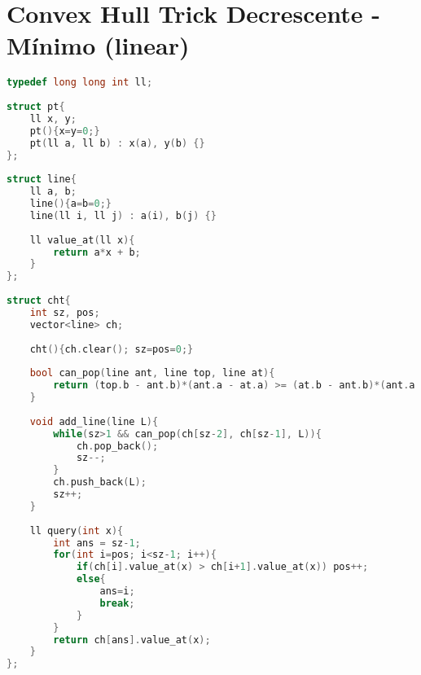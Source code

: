 \documentclass[12pt,a4paper,twoside]{report}
\begin{document}
\section{Convex Hull Trick Decrescente - Mínimo (linear)}
\noindent\begin{lstlisting}[caption=Convex Hull Trick Decrescente - Mínimo (linear),language=C++]
typedef long long int ll;
 
struct pt{
    ll x, y;
    pt(){x=y=0;}
    pt(ll a, ll b) : x(a), y(b) {}
};
 
struct line{
    ll a, b;
    line(){a=b=0;}
    line(ll i, ll j) : a(i), b(j) {}
     
    ll value_at(ll x){
        return a*x + b;
    }
};
 
struct cht{
    int sz, pos;
    vector<line> ch;
     
    cht(){ch.clear(); sz=pos=0;}
     
    bool can_pop(line ant, line top, line at){
        return (top.b - ant.b)*(ant.a - at.a) >= (at.b - ant.b)*(ant.a - top.a);
    }
     
    void add_line(line L){
        while(sz>1 && can_pop(ch[sz-2], ch[sz-1], L)){
            ch.pop_back();
            sz--;
        }
        ch.push_back(L);
        sz++;
    }
     
    ll query(int x){
        int ans = sz-1;
        for(int i=pos; i<sz-1; i++){
            if(ch[i].value_at(x) > ch[i+1].value_at(x)) pos++;
            else{
                ans=i;
                break;
            }
        }
        return ch[ans].value_at(x);
    } 
};
\end{lstlisting}
\end{document}
